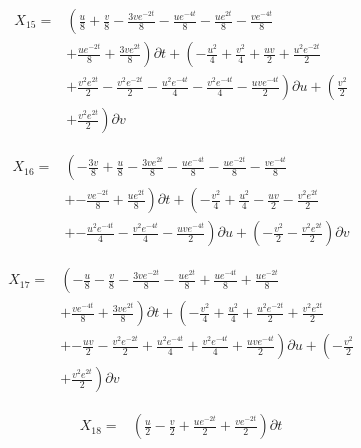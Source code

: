 \begin{align*}
X_{15}=&\left(\frac{u}{8}+\frac{v}{8}- \frac{3 v e^{- 2 t}}{8}- \frac{u e^{- 4 t}}{8}- \frac{u e^{2 t}}{8}- \frac{v e^{- 4 t}}{8}\right.\\
&+\left.\frac{u e^{- 2 t}}{8}+\frac{3 v e^{2 t}}{8} \right)\partial t+\left(- \frac{u^{2}}{4}+\frac{v^{2}}{4}+\frac{u v}{2}+\frac{u^{2} e^{- 2 t}}{2}\right.\\
&+\left.\frac{v^{2} e^{2 t}}{2}- \frac{v^{2} e^{- 2 t}}{2}- \frac{u^{2} e^{- 4 t}}{4}- \frac{v^{2} e^{- 4 t}}{4}- \frac{u v e^{- 4 t}}{2} \right)\partial u+\left(\frac{v^{2}}{2}\right.\\
&+\left.\frac{v^{2} e^{2 t}}{2} \right)\partial v
\end{align*}

\begin{align*}
X_{16}=&\left(- \frac{3 v}{8}+\frac{u}{8}- \frac{3 v e^{2 t}}{8}- \frac{u e^{- 4 t}}{8}- \frac{u e^{- 2 t}}{8}- \frac{v e^{- 4 t}}{8}\right.\\
&+\left.- \frac{v e^{- 2 t}}{8}+\frac{u e^{2 t}}{8} \right)\partial t+\left(- \frac{v^{2}}{4}+\frac{u^{2}}{4}- \frac{u v}{2}- \frac{v^{2} e^{2 t}}{2}\right.\\
&+\left.- \frac{u^{2} e^{- 4 t}}{4}- \frac{v^{2} e^{- 4 t}}{4}- \frac{u v e^{- 4 t}}{2} \right)\partial u+\left(- \frac{v^{2}}{2}- \frac{v^{2} e^{2 t}}{2} \right)\partial v
\end{align*}

\begin{align*}
X_{17}=&\left(- \frac{u}{8}- \frac{v}{8}- \frac{3 v e^{- 2 t}}{8}- \frac{u e^{2 t}}{8}+\frac{u e^{- 4 t}}{8}+\frac{u e^{- 2 t}}{8}\right.\\
&+\left.\frac{v e^{- 4 t}}{8}+\frac{3 v e^{2 t}}{8} \right)\partial t+\left(- \frac{v^{2}}{4}+\frac{u^{2}}{4}+\frac{u^{2} e^{- 2 t}}{2}+\frac{v^{2} e^{2 t}}{2}\right.\\
&+\left.- \frac{u v}{2}- \frac{v^{2} e^{- 2 t}}{2}+\frac{u^{2} e^{- 4 t}}{4}+\frac{v^{2} e^{- 4 t}}{4}+\frac{u v e^{- 4 t}}{2} \right)\partial u+\left(- \frac{v^{2}}{2}\right.\\
&+\left.\frac{v^{2} e^{2 t}}{2} \right)\partial v
\end{align*}

\begin{align*}
X_{18}=&\left(\frac{u}{2}- \frac{v}{2}+\frac{u e^{- 2 t}}{2}+\frac{v e^{- 2 t}}{2} \right)\partial t
\end{align*}

